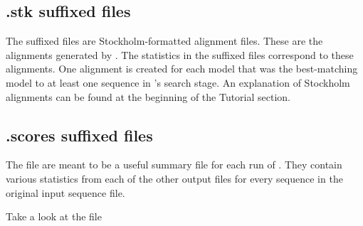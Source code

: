 \subsection{.stk suffixed files}
The  suffixed files are Stockholm-formatted alignment
files. These are the alignments generated by . The
statistics in the  suffixed files correspond to these
alignments. One alignment is created for each model that was the
best-matching model to at least one sequence in 's
search stage. An explanation of Stockholm alignments can be found at
the beginning of the Tutorial section.

\subsection{.scores suffixed files}

The  file are meant to be a useful summary file for each
run of . They contain various statistics from each of
the other output files for every sequence in the original input
sequence file. 

Take a look at the file 


